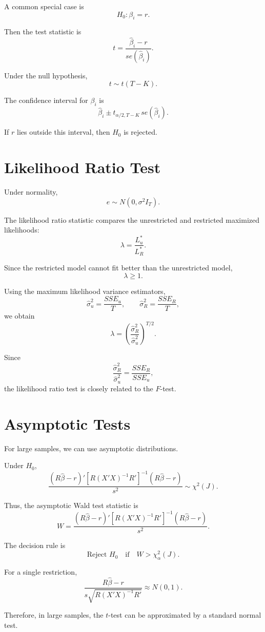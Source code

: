A common special case is
\[
H_0: \beta_i = r.
\]

Then the test statistic is
\[
t
=
\frac{\hat{\beta}_i-r}{se(\hat{\beta}_i)}.
\]

Under the null hypothesis,
\[
t \sim t(T-K).
\]

The confidence interval for $\beta_i$ is
\[
\hat{\beta}_i
\pm
t_{\alpha/2,T-K} \, se(\hat{\beta}_i).
\]

If $r$ lies outside this interval, then $H_0$ is rejected.

\section{Likelihood Ratio Test}

Under normality,
\[
e \sim N(0,\sigma^2 I_T).
\]

The likelihood ratio statistic compares the unrestricted and restricted maximized likelihoods:
\[
\lambda
=
\frac{L_u^*}{L_R^*}.
\]

Since the restricted model cannot fit better than the unrestricted model,
\[
\lambda \geq 1.
\]

Using the maximum likelihood variance estimators,
\[
\hat{\sigma}_u^2
=
\frac{SSE_u}{T},
\qquad
\hat{\sigma}_R^2
=
\frac{SSE_R}{T},
\]
we obtain
\[
\lambda
=
\left(
\frac{\hat{\sigma}_R^2}{\hat{\sigma}_u^2}
\right)^{T/2}.
\]

Since
\[
\frac{\hat{\sigma}_R^2}{\hat{\sigma}_u^2}
=
\frac{SSE_R}{SSE_u},
\]
the likelihood ratio test is closely related to the $F$-test.

\section{Asymptotic Tests}

For large samples, we can use asymptotic distributions.

Under $H_0$,
\[
\frac{
(R\hat{\beta}-r)'
\left[R(X'X)^{-1}R'\right]^{-1}
(R\hat{\beta}-r)
}{
s^2
}
\sim
\chi^2(J).
\]

Thus, the asymptotic Wald test statistic is
\[
W
=
\frac{
(R\hat{\beta}-r)'
\left[R(X'X)^{-1}R'\right]^{-1}
(R\hat{\beta}-r)
}{
s^2
}.
\]

The decision rule is
\[
\text{Reject } H_0
\quad \text{if} \quad
W > \chi^2_{\alpha}(J).
\]

For a single restriction,
\[
\frac{R\hat{\beta}-r}
{
s\sqrt{R(X'X)^{-1}R'}
}
\approx N(0,1).
\]

Therefore, in large samples, the $t$-test can be approximated by a standard normal test.